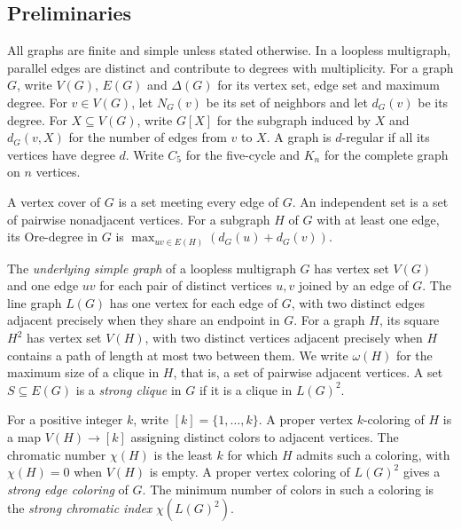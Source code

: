 \documentclass[preprint,11pt,numbers]{elsarticle-arxiv}
\numberwithin{equation}{section}
\theoremstyle{definition}
\begin{document}
\subsection{Preliminaries}\label{sec:prelim}

All graphs are finite and simple unless stated otherwise. In a loopless
multigraph, parallel edges are distinct and contribute to degrees with
multiplicity. For a graph $G$, write $V(G)$, $E(G)$ and $\Delta(G)$ for
its vertex set, edge set and maximum degree. For $v\in V(G)$, let
$N_G(v)$ be its set of neighbors and let $d_G(v)$ be its degree.
For $X\subseteq V(G)$, write $G[X]$ for the subgraph induced by $X$ and
$d_G(v,X)$ for the number of edges from $v$ to $X$.
A graph is $d$-regular if all its vertices have degree $d$. Write $C_5$
for the five-cycle and $K_n$ for the complete graph on $n$ vertices.

A vertex cover of $G$ is a set meeting every edge of $G$. An independent
set is a set of pairwise nonadjacent vertices. For a subgraph $H$ of $G$
with at least one edge, its Ore-degree in $G$ is
$\max_{uv\in E(H)}(d_G(u)+d_G(v))$.

The \emph{underlying simple graph} of a loopless multigraph $G$
has vertex set $V(G)$ and one edge
$uv$ for each pair of distinct vertices $u,v$ joined by an edge of $G$.
The line graph $L(G)$ has
one vertex for each edge of $G$, with two distinct edges adjacent
precisely when they share an endpoint in $G$. For a graph $H$,
its square $H^2$ has vertex set $V(H)$, with two distinct vertices
adjacent precisely when $H$ contains a path of length at most two
between them. We write $\omega(H)$ for the maximum size of a clique in
$H$, that is, a set of pairwise adjacent vertices. A set
$S\subseteq E(G)$ is a \emph{strong clique} in $G$ if it is a clique
in $L(G)^2$.

For a positive integer $k$, write $[k]=\{1,\ldots,k\}$. A proper vertex
$k$-coloring of $H$ is a map $V(H)\to[k]$ assigning distinct colors to
adjacent vertices. The chromatic number $\chi(H)$ is the least $k$ for
which $H$ admits such a coloring, with $\chi(H)=0$ when $V(H)$ is empty.
A proper vertex coloring of $L(G)^2$ gives a \emph{strong edge
coloring} of $G$. The minimum number of colors in such a coloring is
the \emph{strong chromatic index} $\chi(L(G)^2)$.
\end{document}
